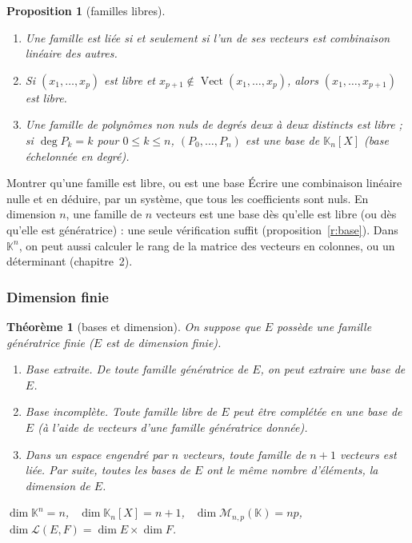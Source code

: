 \documentclass[a4paper,11pt]{article}
\numberwithin{equation}{section}
\numberwithin{figure}{section}
\numberwithin{table}{section}
\theoremstyle{enonce}
\newtheorem{theoreme}[definition]{Théorème}
\newtheorem{proposition}[definition]{Proposition}
\theoremstyle{exemple}
\theoremstyle{remarque}
\newcommand{\K}{\mathbb{K}}
\newcommand{\vect}{\operatorname{Vect}}
\begin{document}
\begin{proposition}[familles libres]\label{r:libres}
\begin{enumerate}
\item Une famille est liée si et seulement si l'un de ses vecteurs est combinaison linéaire des autres.
\item Si $(x_1,\dots,x_p)$ est libre et $x_{p+1}\notin\vect(x_1,\dots,x_p)$, alors $(x_1,\dots,x_{p+1})$ est libre.
\item Une famille de polynômes non nuls de degrés deux à deux distincts est libre ; si $\deg P_k=k$ pour $0\leq k\leq n$,
$(P_0,\dots,P_n)$ est une base de $\K_n[X]$ (base \emph{échelonnée en degré}).
\end{enumerate}
\end{proposition}

\begin{methode}{Montrer qu'une famille est libre, ou est une base}\label{m:libre}
Écrire une combinaison linéaire nulle et en déduire, par un système, que tous les coefficients sont nuls. En dimension $n$, une
famille de $n$ vecteurs est une base dès qu'elle est libre (ou dès qu'elle est génératrice) : une seule vérification suffit
(proposition~\ref{r:base}). Dans $\K^n$, on peut aussi calculer le rang de la matrice des vecteurs en colonnes, ou un
déterminant (chapitre~2).
\end{methode}

\subsubsection*{Dimension finie}

\begin{theoreme}[bases et dimension]\label{r:dim}
On suppose que $E$ possède une famille génératrice finie ($E$ est \emph{de dimension finie}).
\begin{enumerate}
\item \emph{Base extraite.} De toute famille génératrice de $E$, on peut extraire une base de $E$.
\item \emph{Base incomplète.} Toute famille libre de $E$ peut être complétée en une base de $E$ (à l'aide de vecteurs d'une
famille génératrice donnée).
\item Dans un espace engendré par $n$ vecteurs, toute famille de $n+1$ vecteurs est liée. Par suite, toutes les bases de $E$ ont
le même nombre d'éléments, la \emph{dimension} de $E$.
\end{enumerate}
$\dim\K^n=n$, \ $\dim\K_n[X]=n+1$, \ $\dim\mathcal M_{n,p}(\K)=np$, \ $\dim\mathcal L(E,F)=\dim E\times\dim F$.
\end{theoreme}
\end{document}
